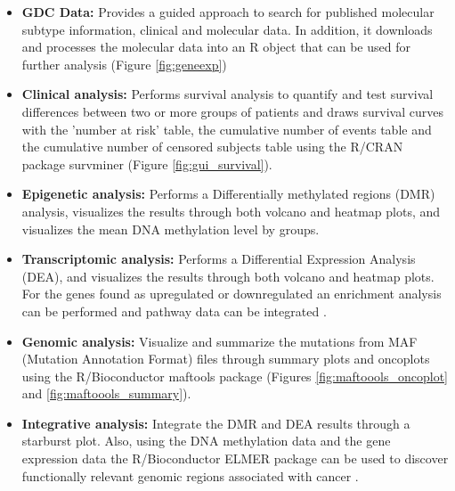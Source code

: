 
\begin{itemize}
	\item \textbf{GDC Data:} Provides a guided approach to search for published molecular subtype information, clinical and molecular data. In addition, it downloads and processes the molecular data into an R object that can be used for further analysis (Figure \ref{fig:geneexp})
	\item \textbf{Clinical analysis:} Performs survival analysis to quantify and test survival differences between two or more groups of patients and draws survival curves with the 'number at risk' table, the cumulative number of events table and the cumulative number of censored subjects table using the R/CRAN package survminer \cite{survminer} (Figure \ref{fig:gui_survival}).
	\item \textbf{Epigenetic analysis:} Performs a Differentially methylated regions (DMR) analysis, visualizes the results through both volcano and heatmap plots, and visualizes the mean DNA methylation level by groups.
	\item \textbf{Transcriptomic analysis:} Performs a Differential Expression Analysis (DEA), and visualizes the results through both volcano and heatmap plots. For the genes found as upregulated or downregulated an enrichment analysis can be performed and pathway data can be integrated \cite{luo2013pathview}.
 	\item \textbf{Genomic analysis:} Visualize and summarize the mutations from MAF (Mutation Annotation Format) files through summary plots and oncoplots using the R/Bioconductor maftools package \cite{Gu20052016,Maftools}
  (Figures \ref{fig:maftoools_oncoplot} and \ref{fig:maftoools_summary}).
	\item \textbf{Integrative analysis:} Integrate the DMR and DEA results through a starburst plot. Also, using the DNA methylation data and the gene expression data the R/Bioconductor ELMER package can be used to discover functionally relevant genomic regions associated with cancer \cite{yao2015inferring, ELMER2}.
\end{itemize}

